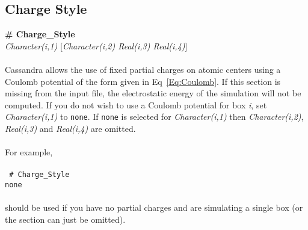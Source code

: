 \subsection{Charge Style}\label{sec:Charge_Style}
{\bf \# Charge\_Style} \\
{\it Character(i,1)} [{\it Character(i,2) Real(i,3) Real(i,4)}] \\ \\
%
Cassandra allows the use of fixed partial charges on atomic centers
using a Coulomb potential of the form given in Eq~\ref{Eq:Coulomb}.
If this section is missing from the input file,
the electrostatic energy of the simulation will not be computed.
If you do not wish to use a Coulomb potential for box {\em i},
set {\it Character(i,1)} to \texttt{none}. If \texttt{none} is
selected for {\it Character(i,1)} then {\it Character(i,2)},
{\it  Real(i,3)} and {\it Real(i,4)} are omitted.
\\ \\
For example, \\ \\
\texttt{
\# Charge\_Style \\
none}
\\ \\
should be used if you have no partial charges and are simulating a single box
(or the section can just be omitted).

